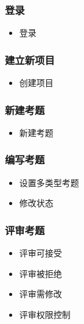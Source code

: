 \documentclass[hyperref, a4paper]{ctexart}
\providecommand{\tightlist}{%
  \setlength{\itemsep}{0pt}\setlength{\parskip}{0pt}}
\begin{document}
\hypertarget{ux767bux5f55-1}{%
\subsubsection{登录}\label{ux767bux5f55-1}}

\begin{itemize}
\tightlist
\item
  登录
\end{itemize}

\hypertarget{ux5efaux7acbux65b0ux9879ux76ee-1}{%
\subsubsection{建立新项目}\label{ux5efaux7acbux65b0ux9879ux76ee-1}}

\begin{itemize}
\tightlist
\item
  创建项目
\end{itemize}

\hypertarget{ux65b0ux5efaux8003ux9898-1}{%
\subsubsection{新建考题}\label{ux65b0ux5efaux8003ux9898-1}}

\begin{itemize}
\tightlist
\item
  新建考题
\end{itemize}

\hypertarget{ux7f16ux5199ux8003ux9898-1}{%
\subsubsection{编写考题}\label{ux7f16ux5199ux8003ux9898-1}}

\begin{itemize}
\tightlist
\item
  设置多类型考题
\item
  修改状态
\end{itemize}

\hypertarget{ux8bc4ux5ba1ux8003ux9898-1}{%
\subsubsection{评审考题}\label{ux8bc4ux5ba1ux8003ux9898-1}}

\begin{itemize}
\tightlist
\item
  评审可接受
\item
  评审被拒绝
\item
  评审需修改
\item
  评审权限控制
\end{itemize}
\end{document}
